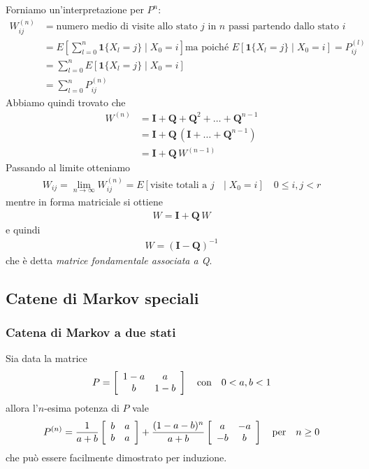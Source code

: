 \documentclass{article}
\begin{document}
Forniamo un'interpretazione per $P^n$:
\begin{align*}
W_{ij}^{(n)} &= \text{numero medio di visite allo stato $j$ in $n$ passi partendo dallo stato $i$}\\
&= E\left[\sum_{l=0}^n\textbf{1}\{X_l = j\} \mid X_0 = i\right] \text{ma poiché } E[\textbf{1}\{X_l = j\} \mid X_0 = i] = P_{ij}^{(l)}\\
&= \sum_{l=0}^n E[\mathbf{1}\{X_l = j\} \mid X_0 = i]\\
&= \sum_{l=0}^n P_{ij}^{(n)}
\end{align*}
Abbiamo quindi trovato che
\begin{align*}
W^{(n)} &= \textbf{I} + \textbf{Q} + \textbf{Q}^2 + \hdots + \textbf{Q}^{n-1}\\
&= \textbf{I} + \textbf{Q}\,(\textbf{I} + \hdots + \textbf{Q}^{n-1})\\
&= \textbf{I} + \textbf{Q}\,W^{(n-1)}
\end{align*}
Passando al limite otteniamo
\begin{align*}
W_{ij} = \lim_{n\to \infty} W_{ij}^{(n)} = E[\text{visite totali a $j$ }\mid X_0= i] \quad 0 \le i,j < r
\end{align*}
mentre in forma matriciale si ottiene
\begin{align*}
W = \textbf{I} + \textbf{Q}\,W
\end{align*}
e quindi
\begin{align}
\label{mc_matrice_fondamentale_Q}
W = (\textbf{I} - \textbf{Q})^{-1}
\end{align}
che è detta \textit{matrice fondamentale associata a Q}.

\subsection{Catene di Markov speciali}

\subsubsection{Catena di Markov a due stati}

Sia data la matrice
\begin{align*}
P = \left[\begin{array}{c c}
1 - a & a\\
b & 1-b
\end{array}\right] \quad \text{con} \quad 0 < a,b < 1
\end{align*}
allora l'$n$-esima potenza di $P$ vale 
\begin{align*}
P^{(n)} = \frac{1}{a+b}\left[\begin{array}{c c}
b & a\\
b & a
\end{array}\right] + \frac{(1 -a - b)^n}{a+b}
\left[\begin{array}{c c}
a &-a\\
-b & b
\end{array}\right] \quad \text{per} \quad n \ge 0
\end{align*}
che può essere facilmente dimostrato per induzione.
\end{document}
